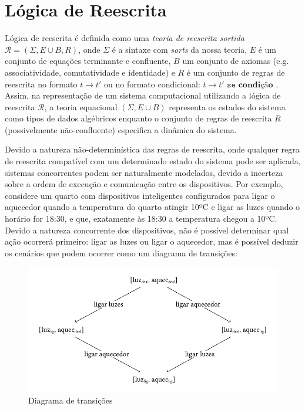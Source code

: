 \section{Lógica de Reescrita} \label{sec:chap2}

Lógica de reescrita é definida como uma \textit{teoria de reescrita sortida} $\mathcal{R} = (\Sigma, E \cup B, R)$, onde $\Sigma$ é a sintaxe com \emph{sorts} da nossa teoria, $E$ é um conjunto de equações terminante e confluente, $B$ um conjunto de axiomas (e.g. associatividade, comutatividade e identidade) e $R$ é um conjunto de regras de reescrita no formato $t \rightarrow t'$ ou no formato condicional: $t \rightarrow t' \texttt{ se } \textbf{condição}$ \cite{RewritingLogicTwentyYears}. Assim, na representação de um sistema computacional utilizando a lógica de reescrita $\mathcal{R}$, a teoria equacional $(\Sigma, E \cup B)$ representa os estados do sistema como tipos de dados algébricos enquanto o conjunto de regras de reescrita $R$ (possivelmente não-confluente) especifica a dinâmica do sistema.

Devido a natureza não-determinística das regras de reescrita, onde qualquer regra de reescrita compatível com um determinado estado do sistema pode ser aplicada, sistemas concorrentes podem ser naturalmente modelados, devido a incerteza sobre a ordem de execução e comunicação entre os dispositivos. 
Por exemplo, considere um quarto com dispositivos inteligentes configurados para ligar o aquecedor quando a temperatura do quarto atingir 10ºC e ligar as luzes quando o horário for 18:30, e que, exatamente às 18:30 a temperatura chegou a 10ºC. Devido a natureza concorrente dos dispositivos, não é possível determinar qual ação ocorrerá primeiro: ligar as luzes ou ligar o aquecedor, mas é possível deduzir os cenários que podem ocorrer como um diagrama de transições:

\begin{figure}[h]
  \centering
  \includegraphics{img/diagram.pdf}
  \caption{Diagrama de transições}
  \label{fig:fig1}
\end{figure}

